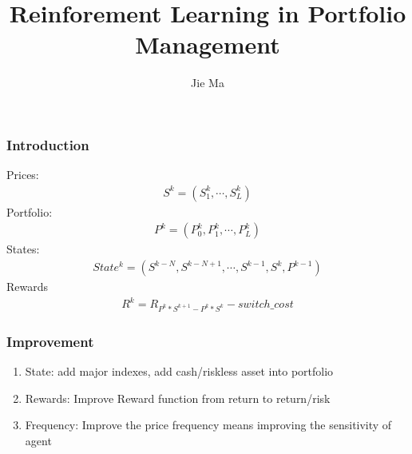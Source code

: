 \documentclass[11pt]{beamer}
\author{Jie Ma}
\title{Reinforement Learning in Portfolio Management}
\begin{document}
\frame{\titlepage}

\begin{frame}[c]\frametitle{Introduction}
    Prices:
    \begin{align*}
        S^{k}=(S_{1}^{k},\cdots,S_{L}^{k})
    \end{align*}
    Portfolio:
    \begin{align*}
        P^{k}=(P_{0}^{k},P_{1}^{k},\cdots,P_{L}^{k})
    \end{align*}
    States:
    \begin{align*}
        State^{k}=(S^{k-N},S^{k-N+1},\cdots,S^{k-1},S^{k},P^{k-1})
    \end{align*}
    Rewards
    \begin{align*}
        R^{k}=R_{P^{k}*S^{k+1}-P^{k}*S^{k}}-switch\_cost
    \end{align*}
\end{frame}

\begin{frame}[c]\frametitle{Improvement}
    \begin{enumerate}
        \item State: add major indexes, add cash/riskless asset into portfolio
        \item Rewards: Improve Reward function from return to return/risk
        \item Frequency: Improve the price frequency means improving the sensitivity of agent
    \end{enumerate}
\end{frame}
\end{document}
